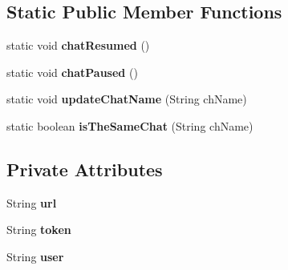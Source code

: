 \subsection*{Static Public Member Functions}
\begin{DoxyCompactItemize}
\item 
static void {\bfseries chat\+Resumed} ()\hypertarget{classcom_1_1example_1_1sebastian_1_1tindertp_1_1application_1_1TinderTP_ad3363b80fb66872b766645755b1b2c20}{}\label{classcom_1_1example_1_1sebastian_1_1tindertp_1_1application_1_1TinderTP_ad3363b80fb66872b766645755b1b2c20}

\item 
static void {\bfseries chat\+Paused} ()\hypertarget{classcom_1_1example_1_1sebastian_1_1tindertp_1_1application_1_1TinderTP_aa03d962aa8774f883c44aba8702abb35}{}\label{classcom_1_1example_1_1sebastian_1_1tindertp_1_1application_1_1TinderTP_aa03d962aa8774f883c44aba8702abb35}

\item 
static void {\bfseries update\+Chat\+Name} (String ch\+Name)\hypertarget{classcom_1_1example_1_1sebastian_1_1tindertp_1_1application_1_1TinderTP_ada4b0a3499cdf6fe9e427e41bc71c4aa}{}\label{classcom_1_1example_1_1sebastian_1_1tindertp_1_1application_1_1TinderTP_ada4b0a3499cdf6fe9e427e41bc71c4aa}

\item 
static boolean {\bfseries is\+The\+Same\+Chat} (String ch\+Name)\hypertarget{classcom_1_1example_1_1sebastian_1_1tindertp_1_1application_1_1TinderTP_a3859f3e6102e3f9e27977a29000bcc95}{}\label{classcom_1_1example_1_1sebastian_1_1tindertp_1_1application_1_1TinderTP_a3859f3e6102e3f9e27977a29000bcc95}

\end{DoxyCompactItemize}
\subsection*{Private Attributes}
\begin{DoxyCompactItemize}
\item 
String {\bfseries url}\hypertarget{classcom_1_1example_1_1sebastian_1_1tindertp_1_1application_1_1TinderTP_a5a03b07522ef98ecbd07a178491a306e}{}\label{classcom_1_1example_1_1sebastian_1_1tindertp_1_1application_1_1TinderTP_a5a03b07522ef98ecbd07a178491a306e}

\item 
String {\bfseries token}\hypertarget{classcom_1_1example_1_1sebastian_1_1tindertp_1_1application_1_1TinderTP_af0e44b15aacc105b0b08f5e9f2845331}{}\label{classcom_1_1example_1_1sebastian_1_1tindertp_1_1application_1_1TinderTP_af0e44b15aacc105b0b08f5e9f2845331}

\item 
String {\bfseries user}\hypertarget{classcom_1_1example_1_1sebastian_1_1tindertp_1_1application_1_1TinderTP_af23d548334cab37b8dde9f90211c8ba0}{}\label{classcom_1_1example_1_1sebastian_1_1tindertp_1_1application_1_1TinderTP_af23d548334cab37b8dde9f90211c8ba0}

\end{DoxyCompactItemize}
